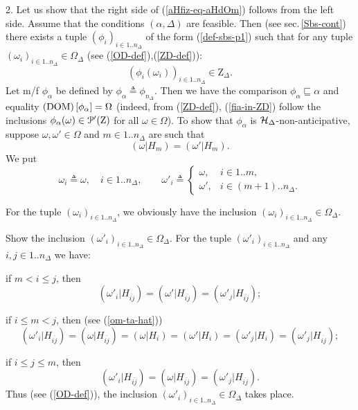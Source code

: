 \documentclass[sn-mathphys,Numbered,pdflatex]{sn-jnl}%
\theoremstyle{thmstyleone}%
\theoremstyle{thmstyletwo}%
\theoremstyle{thmstylethree}%
\newcommand{\nint}[2]{{{#1}..{#2}}}%
\renewcommand{\le}{\leqslant}%
\newcommand{\beq}{\begin{equation}}
\newcommand{\eeq}{\end{equation}}
\newcommand{\mydef}{\mathrel{\triangleq}}%
\newcommand{\icPp}[1]{\EuScript{P^\prime}({#1})}%
\newcommand{\res}[2]{\ensuremath{(#1|#2)}}%
\newcommand{\myLe}{\mathrel{\sqsubseteq}}%
\newcommand{\naOm}{\ensuremath{\Omega}}%
\newcommand{\naZ}{\ensuremath{\mathrm{Z}}}%
\newcommand{\nado}[1]{(\mathrm{DOM})\setbox0=\hbox{\text{$#1$}}\ifdim\wd0=0pt\else\left[{#1}\right]\fi}%
\newcommand{\fref}[1]{{\rm(\ref{#1})}}   %
\begin{document}
2.
Let us show that the right side of \fref{aHfiz-eq-aHdOm} follows from the left side.
Assume that the conditions $(\alpha,\Delta)$ are feasible.
Then (see sec.\,\ref{Sbs-cont}) there exists a tuple $(\phi_i)_{i\in\nint1{n_\Delta}}$ of the form \fref{def-sbs-p1} such that for any tuple $(\omega_i)_{i\in\nint1{n_\Delta}}\in\naOm_\Delta$ (see \fref{OD-def},\fref{ZD-def}):
\beq\label{fia-in-ZD}
(\phi_i(\omega_i))_{i\in\nint1{n_\Delta}}\in\naZ_\Delta.
\eeq
Let m/f $\phi_\alpha$ be defined by $\phi_\alpha\mydef\phi_{n_\Delta}$.
Then we have the comparison $\phi_\alpha\myLe\alpha$ and  equality $\nado{\phi_\alpha}=\naOm$
(indeed, from \fref{ZD-def}, \fref{fia-in-ZD} follow the inclusions $\phi_\alpha(\omega)\in\icPp\naZ$ for all $\omega\in\naOm$).
To show that $\phi_\alpha$ is ${\cal H}_\Delta$-non-anticipative, suppose $\omega,\omega'\in\naOm$ and $m\in\nint1{n_\Delta}$ are such that
\beq\label{om-ta-hat}
\res\omega{H_{m}}=\res{\omega'}{H_{m}}.
\eeq
We put
$$
\omega_i\mydef\omega,\quad i\in\nint1{n_\Delta},\qquad
\omega'_i\mydef
\begin{cases}
\omega,& i\in\nint1{m},\\
\omega',& i\in\nint{(m+1)}{n_\Delta}.
\end{cases}
$$

For the tuple $(\omega_i)_{i\in\nint1{n_\Delta}}$, we obviously have the inclusion $(\omega_i)_{i\in\nint1{n_\Delta}}\in\naOm_\Delta $.

Show the inclusion $(\omega'_i)_{i\in\nint1{n_\Delta}}\in\naOm_\Delta$.
For the tuple $(\omega'_i)_{i\in\nint1{n_\Delta}}$ and any $i,j\in\nint1{n_\Delta}$ we have:

if $m< i\le j$, then
$$
\res{\omega'_i}{H_{\overline{ij}}}=\res{\omega'}{H_{\overline{ij}}}=\res{\omega '_j}{H_{\overline{ij}}};
$$

if $i\le m<j$, then (see \fref{om-ta-hat})
$$
\res{\omega'_i}{H_{\overline{ij}}}=\res{\omega}{H_{\overline{ij}}}=\res{\omega}{H_{i}}=\res{\omega' }{H_{i}}=\res{\omega'_j }{H_{i}}=\res{\omega'_j}{H_{\overline{ij}}};
$$

if $i\le j\le m$, then
$$
\res{\omega'_i}{H_{\overline{ij}}}=\res{\omega}{H_{\overline{ij}}}=\res{\omega' _j}{H_{\overline{ij}}}.
$$
Thus (see \fref{OD-def}), the inclusion $(\omega'_i)_{i\in\nint1{n_\Delta}}\in\naOm_\Delta$ takes place.
\end{document}
